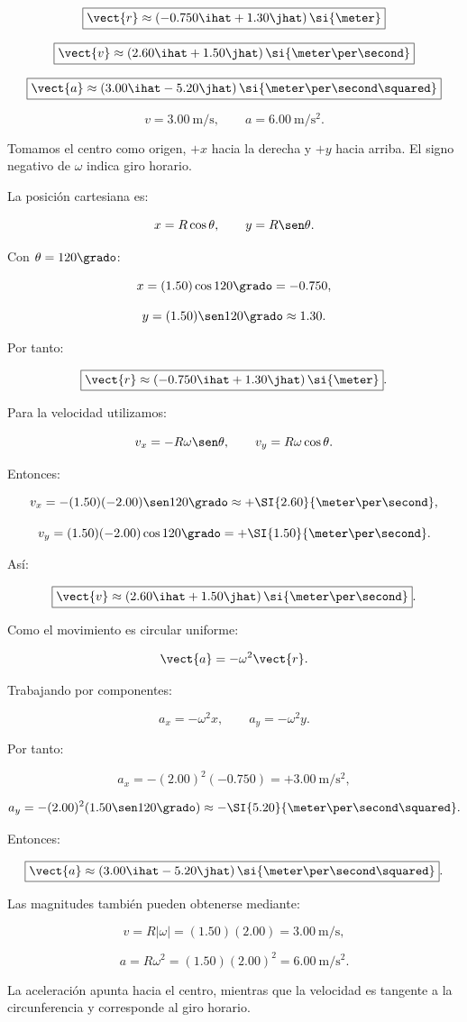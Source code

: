 \begin{respuesta}
\[
\boxed{
\vect{r}
\approx(-0.750\ihat+1.30\jhat)\,\si{\meter}
}
\]

\[
\boxed{
\vect{v}
\approx(2.60\ihat+1.50\jhat)\,
\si{\meter\per\second}
}
\]

\[
\boxed{
\vect{a}
\approx(3.00\ihat-5.20\jhat)\,
\si{\meter\per\second\squared}
}
\]

\[
\boxed{v=\SI{3.00}{\meter\per\second}},
\qquad
\boxed{a=\SI{6.00}{\meter\per\second\squared}}.
\]
\end{respuesta}

\begin{explicacion}
Tomamos el centro como origen, \(+x\) hacia la derecha y
\(+y\) hacia arriba. El signo negativo de \(\omega\) indica
giro horario.

La posición cartesiana es:

\[
x=R\cos\theta,
\qquad
y=R\sen\theta.
\]

Con \(\theta=120\grado\):

\[
x=(1.50)\cos120\grado=-0.750,
\]

\[
y=(1.50)\sen120\grado\approx1.30.
\]

Por tanto:

\[
\boxed{
\vect{r}\approx(-0.750\ihat+1.30\jhat)\,\si{\meter}
}.
\]

Para la velocidad utilizamos:

\[
v_x=-R\omega\sen\theta,
\qquad
v_y=R\omega\cos\theta.
\]

Entonces:

\[
v_x=-(1.50)(-2.00)\sen120\grado
\approx+\SI{2.60}{\meter\per\second},
\]

\[
v_y=(1.50)(-2.00)\cos120\grado
=+\SI{1.50}{\meter\per\second}.
\]

Así:

\[
\boxed{
\vect{v}\approx(2.60\ihat+1.50\jhat)\,
\si{\meter\per\second}
}.
\]

Como el movimiento es circular uniforme:

\[
\vect{a}=-\omega^2\vect{r}.
\]

Trabajando por componentes:

\[
a_x=-\omega^2x,
\qquad
a_y=-\omega^2y.
\]

Por tanto:

\[
a_x=-(2.00)^2(-0.750)
=+\SI{3.00}{\meter\per\second\squared},
\]

\[
a_y=-(2.00)^2(1.50\sen120\grado)
\approx-\SI{5.20}{\meter\per\second\squared}.
\]

Entonces:

\[
\boxed{
\vect{a}\approx(3.00\ihat-5.20\jhat)\,
\si{\meter\per\second\squared}
}.
\]

Las magnitudes también pueden obtenerse mediante:

\[
v=R|\omega|=(1.50)(2.00)
=\SI{3.00}{\meter\per\second},
\]

\[
a=R\omega^2=(1.50)(2.00)^2
=\SI{6.00}{\meter\per\second\squared}.
\]

La aceleración apunta hacia el centro, mientras que la velocidad
es tangente a la circunferencia y corresponde al giro horario.
\end{explicacion}



